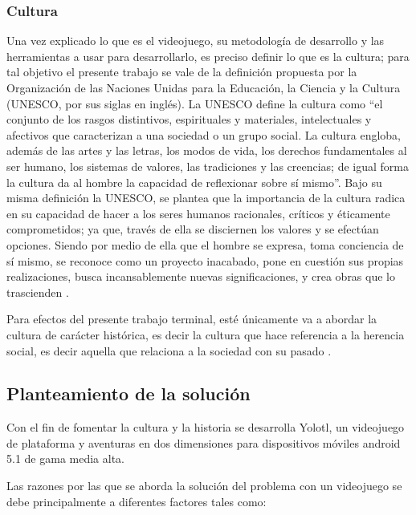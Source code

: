 \subsubsection{Cultura}
Una vez explicado lo que es el videojuego, su metodología de desarrollo y las
herramientas a usar para desarrollarlo, es preciso definir lo que es la cultura;
para tal objetivo el presente trabajo se vale de la definición propuesta por la
Organización de las Naciones Unidas para la Educación, la Ciencia y la Cultura
(UNESCO, por sus siglas en inglés). La UNESCO define la cultura como “el conjunto
de los rasgos distintivos, espirituales y materiales, intelectuales y afectivos
que caracterizan a una sociedad o un grupo social. La cultura engloba, además
de las artes y las letras, los modos de vida, los derechos fundamentales al ser
humano, los sistemas de valores, las tradiciones y las creencias; de igual forma
la cultura da al hombre la capacidad de reflexionar sobre sí mismo\cite{RefCultura}”.
Bajo su misma definición la UNESCO, se plantea que la importancia de la cultura
radica en su capacidad de hacer a los seres humanos racionales, críticos y
éticamente comprometidos; ya que, través de ella se disciernen los valores y se
efectúan opciones. Siendo por medio de ella que el hombre se expresa, toma conciencia
de sí mismo, se reconoce como un proyecto inacabado, pone en cuestión sus propias
realizaciones, busca incansablemente nuevas significaciones, y crea obras que lo
trascienden \cite{RefCultura}.
\\
\par
Para efectos del presente trabajo terminal, esté únicamente va a abordar la cultura
de carácter histórica, es decir la cultura que hace referencia a la herencia social,
es decir aquella que relaciona a la sociedad con su pasado
\cite{RefculturaClasificacionEl}.

\subsection{Planteamiento de la solución}
Con el fin de fomentar la cultura y la historia se desarrolla Yolotl, un videojuego
de plataforma y aventuras en dos dimensiones para dispositivos móviles android 5.1
de gama media alta.
\\
\par
Las razones por las que se aborda la solución del problema con un videojuego se
debe principalmente a diferentes factores tales como:

